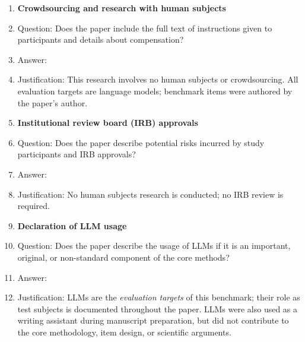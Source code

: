 \documentclass{article}
\begin{document}
\begin{enumerate}
\item \textbf{Crowdsourcing and research with human subjects}
    \item[] Question: Does the paper include the full text of instructions given to participants and details about compensation?
    \item[] Answer: \answerNA{}
    \item[] Justification: This research involves no human subjects or crowdsourcing. All evaluation targets are language models; benchmark items were authored by the paper's author.

\item \textbf{Institutional review board (IRB) approvals}
    \item[] Question: Does the paper describe potential risks incurred by study participants and IRB approvals?
    \item[] Answer: \answerNA{}
    \item[] Justification: No human subjects research is conducted; no IRB review is required.

\item \textbf{Declaration of LLM usage}
    \item[] Question: Does the paper describe the usage of LLMs if it is an important, original, or non-standard component of the core methods?
    \item[] Answer: \answerYes{}
    \item[] Justification: LLMs are the \emph{evaluation targets} of this benchmark; their role as test subjects is documented throughout the paper. LLMs were also used as a writing assistant during manuscript preparation, but did not contribute to the core methodology, item design, or scientific arguments.

\end{enumerate}
\end{document}
